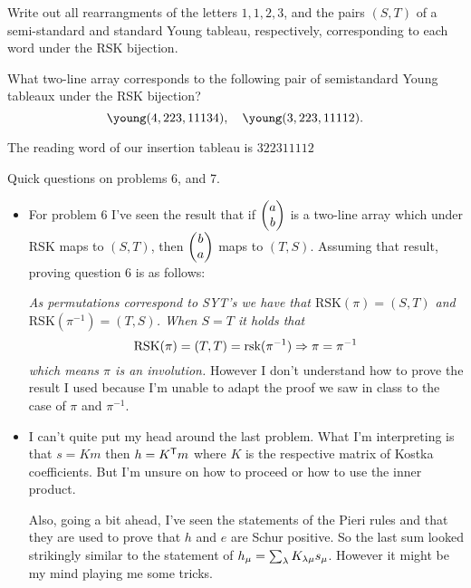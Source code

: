 \documentclass[12pt]{memoir}
\begin{document}
\begin{Ej}[Exercise 4]
    Write out all rearrangments of the letters $1, 1, 2, 3$, and the pairs $(S, T )$ of a semi-standard
and standard Young tableau, respectively, corresponding to each word under the RSK bijection.
\end{Ej}

\begin{Ej}[Exercise 5]
    What two-line array corresponds to the following pair of semistandard Young tableaux
    under the RSK bijection?
    $$\young(4,223,11134),\quad\young(3,223,11112).$$
\end{Ej}

\begin{ptcbr}
    The reading word of our insertion tableau is $322311112$
\end{ptcbr}

Quick questions on problems 6, and 7.
\begin{itemize}
    \item For problem 6 I've seen the result that if $\begin{pmatrix} a \\ b \end{pmatrix}$ is a two-line array which under RSK maps to $(S,T)$, then $\begin{pmatrix} b \\ a \end{pmatrix}$ maps to $(T,S)$. Assuming that result, proving question 6 is as follows:\par 
    \emph{As permutations correspond to SYT's we have that $\text{RSK}(\pi)=(S,T)$ and $\text{RSK}(\pi^{-1})=(T,S)$. When $S=T$ it holds that}
    $$\text{RSK}(\pi)=(T,T)=\text{rsk}(\pi^{-1})\Rightarrow \pi=\pi^{-1}$$
    \emph{which means $\pi$ is an involution.} However I don't understand how to prove the result I used because I'm unable to adapt the proof we saw in class to the case of $\pi$ and $\pi^{-1}$.
    \item I can't quite put my head around the last problem. What I'm interpreting is that $s=Km$ then $h=K^{\mathsf{T}}m$ where $K$ is the respective matrix of Kostka coefficients. But I'm unsure on how to proceed or how to use the inner product.\par 
    Also, going a bit ahead, I've seen the statements of the Pieri rules and that they are used to prove that $h$ and $e$ are Schur positive. So the last sum looked strikingly similar to the statement of $h_{\mu}=\sum_\lambda K_{\lambda\mu}s_\mu$. However it might be my mind playing me some tricks.
\end{itemize}
\end{document}
